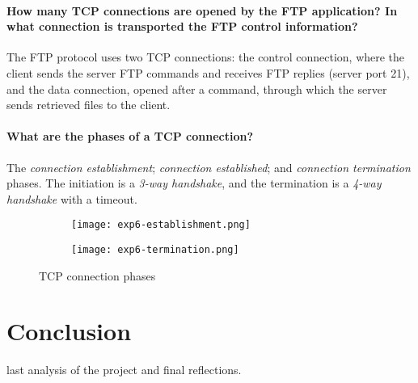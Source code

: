 \documentclass[compilation.tex]{subfiles}
\begin{document}
	\paragraph{How many TCP connections are opened by the FTP application? In what connection is transported the FTP control information?}
	The FTP protocol uses two TCP connections: the control connection, where the client sends the server FTP commands and receives FTP replies (server port 21), and the data connection, opened after a  command, through which the server sends retrieved files to the client.
	
	\paragraph{What are the phases of a TCP connection?}
	The \textsl{connection establishment}; \textsl{connection established}; and \textsl{connection termination} phases. The initiation is a \textit{3-way handshake}, and the termination is a \textit{4-way handshake} with a timeout.
	
	\begin{figure}[hbt]
		\centering
		\begin{subfigure}[b]{\textwidth}
			\centering
			\texttt{[image: exp6-establishment.png]}
			\vspace*{.8\baselineskip}
		\end{subfigure}
		\begin{subfigure}[b]{\textwidth}
			\centering
			\texttt{[image: exp6-termination.png]}
			\vspace*{.8\baselineskip}
		\end{subfigure}
		\caption{TCP connection phases}
		\label{fig:exp6-phases}
	\end{figure}
	
	
	\section{Conclusion}
	\label{sec:conclusion}
		last analysis of the project and final reflections.
	
\end{document}
